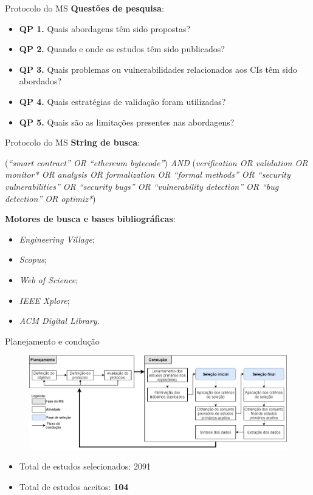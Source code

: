 \begin{frame}{Protocolo do MS}
\textbf{Questões de pesquisa}:
    \begin{itemize}
        \item \textbf{QP 1.} Quais abordagens têm sido propostas?
        \item \textbf{QP 2.} Quando e onde os estudos têm sido publicados?
        \item \textbf{QP 3.} Quais problemas ou vulnerabilidades relacionados aos CIs têm sido abordados?
        \item \textbf{QP 4.} Quais estratégias de validação foram utilizadas?
        \item \textbf{QP 5.} Quais são as limitações presentes nas abordagens?
    \end{itemize}    
\end{frame}

\begin{frame}{Protocolo do MS}
\textbf{String de busca}:
    \begin{center}
    (\textit{``smart contract'' OR ``ethereum bytecode''}) \textit{AND} (\textit{verification OR validation OR monitor* OR analysis OR formalization OR ``formal methods'' OR ``security vulnerabilities'' OR ``security bugs'' OR ``vulnerability detection'' OR ``bug detection'' OR optimiz*})
    \end{center}
\textbf{Motores de busca e bases bibliográficas}:
    \begin{itemize}
        \item \textit{Engineering Village};
        \item \textit{Scopus};
        \item \textit{Web of Science};
        \item \textit{IEEE Xplore};
        \item \textit{ACM Digital Library}.
    \end{itemize}
\end{frame}

\begin{frame}{Planejamento e condução}
    \begin{figure}[!htb]
     \centering
     \includegraphics[scale=0.3]{figuras/metodologia/ms_fluxo.png}
    \end{figure}
    \begin{itemize}
        \item Total de estudos selecionados: 2091
        \item Total de estudos aceitos: \textbf{104}
    \end{itemize}
\end{frame}

